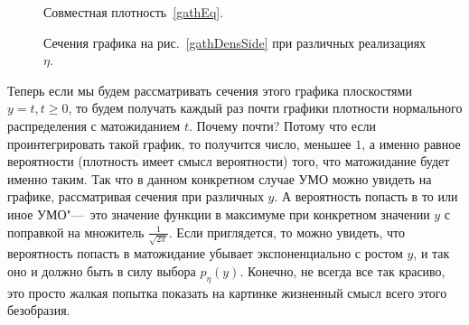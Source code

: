 \documentclass[../TV&MS.tex]{subfiles}
\begin{document}
\begin{figure}
\centering
\begin{minipage}[b]{0.5\textwidth}
    \centering
    \vfill
    \caption{Совместная плотность~\eqref{gathEq}.}
    \label{gathDensSide}
\end{minipage}%
\hfill
\begin{minipage}[b]{0.5\textwidth}
    \centering
    \vfill
    \caption{Сечения графика на рис.~\ref{gathDensSide} при различных реализациях $\eta$.}
    \label{cutsGathDens}
\end{minipage}
\end{figure}

Теперь если мы будем рассматривать сечения этого графика плоскостями
$y=t, t \geqslant 0$, то будем получать каждый раз почти графики плотности
нормального распределения с матожиданием $t$.
Почему почти? Потому что если проинтегрировать такой график, то получится
число, меньшее $1$, а именно равное вероятности (плотность имеет смысл
вероятности) того, что матожидание будет именно таким.
Так что в данном конкретном случае УМО можно увидеть на графике, рассматривая
сечения при различных $y$.
А вероятность попасть в то или иное УМО"---~это значение функции в максимуме
при конкретном значении $y$ с поправкой на множитель $\frac{1}{\sqrt{2\pi}}$. 
Если приглядется, то можно увидеть, что вероятность попасть в матожидание
убывает экспоненциально с ростом $y$, и так оно и должно быть в силу выбора
$p_\eta(y)$. 
Конечно, не всегда все так красиво, это просто жалкая попытка показать
на картинке жизненный смысл всего этого безобразия.


\newpage
\end{document}
